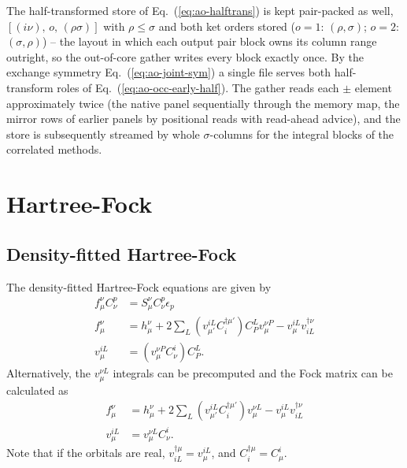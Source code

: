 \documentclass[a4paper,12pt,oneside]{book}
\newcommand{\eq}[1]{Eq.~(\ref{#1})}
\begin{document}
The half-transformed store of \eq{eq:ao-halftrans} is kept pair-packed as well,
$\left[(i\nu),\, o,\, (\rho\sigma)\right]$ with $\rho\le\sigma$ and both ket orders stored
($o=1$: $(\rho,\sigma)$; $o=2$: $(\sigma,\rho)$) -- the layout in which each output pair block
owns its column range outright, so the out-of-core gather writes every block exactly once. By the
exchange symmetry \eq{eq:ao-joint-sym} a single file serves both half-transform roles of
\eq{eq:ao-occ-early-half}. The gather reads each $\pm$ element approximately twice (the native
panel sequentially through the memory map, the mirror rows of earlier panels by positional reads
with read-ahead advice), and the store is subsequently streamed by whole $\sigma$-columns for the
integral blocks of the correlated methods.


\chapter{Hartree-Fock}
\section{Density-fitted Hartree-Fock}
The density-fitted Hartree-Fock equations are given by
\begin{equation}
\begin{aligned}
f_\mu^\nu C_\nu^p &= S_\mu^\nu C_\nu^p \epsilon_p\\
f_\mu^\nu &= h_\mu^\nu + 2\sum_L\left(v_{\mu'}^{iL} C^{\dagger\mu'}_i\right) C_{P}^{L} v_{\mu}^{\nu P}
- v_{\mu}^{iL} v^{\dagger\nu}_{iL}\\
v_{\mu}^{iL} &= \left(v_{\mu}^{\nu P} C_{\nu}^i\right) C_P^L.
\end{aligned}
\end{equation}
Alternatively, the $v_{\mu}^{\nu L}$ integrals can be precomputed and the Fock matrix can be calculated as
\begin{equation}
\begin{aligned}
f_\mu^\nu &= h_\mu^\nu + 2\sum_L\left(v_{\mu'}^{iL} C^{\dagger\mu'}_i\right) v_{\mu}^{\nu L}
- v_{\mu}^{iL} v^{\dagger\nu}_{iL}\\
v_{\mu}^{iL} &= v_{\mu}^{\nu L} C_{\nu}^i.
\end{aligned}
\end{equation}
Note that if the orbitals are real, $v^{\dagger\mu}_{iL} = v_{\mu}^{iL}$, 
and $C^{\dagger\mu}_i = C_{\mu}^i$.
\end{document}
